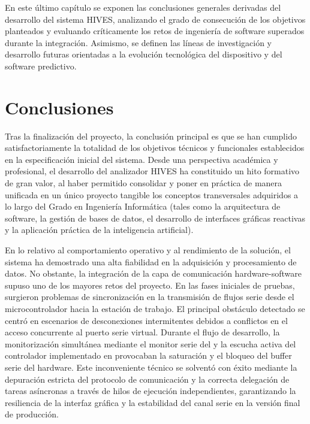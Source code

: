 
En este último capítulo se exponen las conclusiones generales derivadas del desarrollo del sistema HIVES, analizando el grado de consecución de los objetivos planteados y evaluando críticamente los retos de ingeniería de software superados durante la integración. Asimismo, se definen las líneas de investigación y desarrollo futuras orientadas a la evolución tecnológica del dispositivo y del software predictivo.

\section{Conclusiones}

Tras la finalización del proyecto, la conclusión principal es que se han cumplido satisfactoriamente la totalidad de los objetivos técnicos y funcionales establecidos en la especificación inicial del sistema. Desde una perspectiva académica y profesional, el desarrollo del analizador HIVES ha constituido un hito formativo de gran valor, al haber permitido consolidar y poner en práctica de manera unificada en un único proyecto tangible los conceptos transversales adquiridos a lo largo del Grado en Ingeniería Informática (tales como la arquitectura de software, la gestión de bases de datos, el desarrollo de interfaces gráficas reactivas y la aplicación práctica de la inteligencia artificial).

En lo relativo al comportamiento operativo y al rendimiento de la solución, el sistema ha demostrado una alta fiabilidad en la adquisición y procesamiento de datos. No obstante, la integración de la capa de comunicación hardware-software supuso uno de los mayores retos del proyecto. En las fases iniciales de pruebas, surgieron problemas de sincronización en la transmisión de flujos serie desde el microcontrolador hacia la estación de trabajo. El principal obstáculo detectado se centró en escenarios de desconexiones intermitentes debidos a conflictos en el acceso concurrente al puerto serie virtual. Durante el flujo de desarrollo, la monitorización simultánea mediante el monitor serie del  y la escucha activa del controlador implementado en  provocaban la saturación y el bloqueo del buffer serie del hardware. Este inconveniente técnico se solventó con éxito mediante la depuración estricta del protocolo de comunicación y la correcta delegación de tareas asíncronas a través de hilos de ejecución independientes, garantizando la resiliencia de la interfaz gráfica y la estabilidad del canal serie en la versión final de producción.

